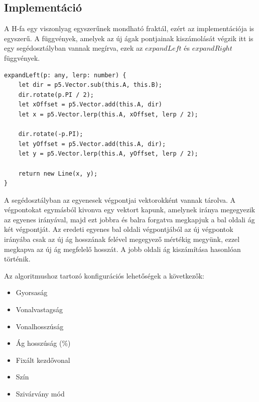 \subsection*{Implementáció}
A H-fa egy viszonlyag egyszerűnek mondható fraktál, ezért az implementációja is egyszerű. A függvények, amelyek az új ágak pontjainak kiszámolását végzik itt is egy segédosztályban vannak megírva, ezek az $expandLeft$ és $expandRight$ függvények.
\begin{lstlisting}
expandLeft(p: any, lerp: number) {
	let dir = p5.Vector.sub(this.A, this.B);
	dir.rotate(p.PI / 2);
	let xOffset = p5.Vector.add(this.A, dir)
	let x = p5.Vector.lerp(this.A, xOffset, lerp / 2);
	
	dir.rotate(-p.PI);
	let yOffset = p5.Vector.add(this.A, dir);
	let y = p5.Vector.lerp(this.A, yOffset, lerp / 2);
	
	return new Line(x, y);
}
\end{lstlisting}
A segédosztályban az egyenesek végpontjai vektorokként vannak tárolva. A végpontokat egymásból kivonva egy vektort kapunk, amelynek iránya megegyezik az egyenes irányával, majd ezt jobbra és balra forgatva megkapjuk a bal oldali ág két végpontját. Az eredeti egyenes bal oldali végpontjából az új végpontok irányába csak az új ág hosszának felével megegyező mértékig megyünk, ezzel megkapva az új ág megfelelő hosszát. A jobb oldali ág kiszámítása hasonlóan történik.
\par Az algoritmushoz tartozó konfigurációs lehetőségek a következők:
\begin{itemize}
	\item Gyorsaság
	\item Vonalvastagság
	\item Vonalhosszúság
	\item Ág hosszúság (\%)
	\item Fixált kezdővonal
	\item Szín
	\item Szivárvány mód
\end{itemize}